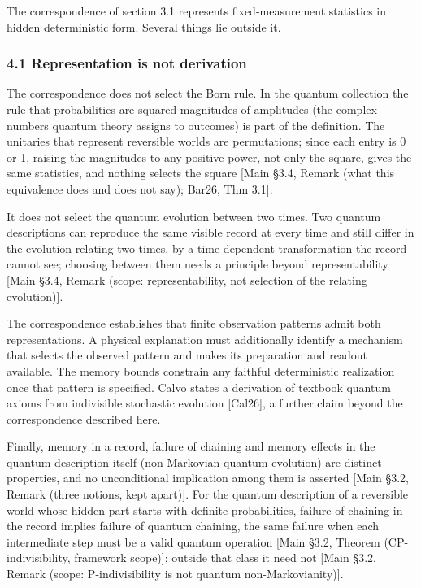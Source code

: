 \documentclass[
]{article}
\begin{document}
The correspondence of section 3.1 represents fixed-measurement
statistics in hidden deterministic form. Several things lie outside it.

\hypertarget{representation-is-not-derivation}{%
\subsubsection{4.1 Representation is not
derivation}\label{representation-is-not-derivation}}

The correspondence does not select the Born rule. In the quantum
collection the rule that probabilities are squared magnitudes of
amplitudes (the complex numbers quantum theory assigns to outcomes) is
part of the definition. The unitaries that represent reversible worlds
are permutations; since each entry is 0 or 1, raising the magnitudes to
any positive power, not only the square, gives the same statistics, and
nothing selects the square {[}Main §3.4, Remark (what this equivalence
does and does not say); Bar26, Thm 3.1{]}.

It does not select the quantum evolution between two times. Two quantum
descriptions can reproduce the same visible record at every time and
still differ in the evolution relating two times, by a time-dependent
transformation the record cannot see; choosing between them needs a
principle beyond representability {[}Main §3.4, Remark (scope:
representability, not selection of the relating evolution){]}.

The correspondence establishes that finite observation patterns admit
both representations. A physical explanation must additionally identify
a mechanism that selects the observed pattern and makes its preparation
and readout available. The memory bounds constrain any faithful
deterministic realization once that pattern is specified. Calvo states a
derivation of textbook quantum axioms from indivisible stochastic
evolution {[}Cal26{]}, a further claim beyond the correspondence
described here.

Finally, memory in a record, failure of chaining and memory effects in
the quantum description itself (non-Markovian quantum evolution) are
distinct properties, and no unconditional implication among them is
asserted {[}Main §3.2, Remark (three notions, kept apart){]}. For the
quantum description of a reversible world whose hidden part starts with
definite probabilities, failure of chaining in the record implies
failure of quantum chaining, the same failure when each intermediate
step must be a valid quantum operation {[}Main §3.2, Theorem
(CP-indivisibility, framework scope){]}; outside that class it need not
{[}Main §3.2, Remark (scope: P-indivisibility is not quantum
non-Markovianity){]}.
\end{document}

